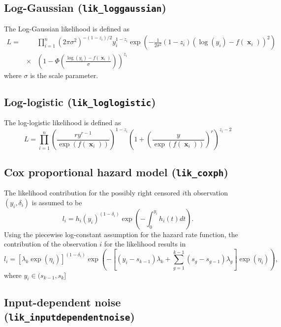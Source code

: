 \documentclass[twoside,11pt]{article}
\DeclareMathOperator{\x}{\mathbf{x}}
\newcommand{\code}[1]{{\normalfont\texttt{#1}}}
\begin{document}
\subsection*{Log-Gaussian (\code{lik\_loggaussian})}

The Log-Gaussian likelihood is defined as
\begin{eqnarray}
  L =  && \prod_{i=1}^n (2\pi \sigma^2)^{-(1-z_i)/2}y_i^{1-z_i} \exp \left(-\frac{1}{2\sigma^2}(1-z_i)(\log (y_i) - f(\x_i))^2\right) \\ \nonumber
  &\times & \left(1 - \Phi \left(\frac{\log(y_i) - f(\x_i)}{\sigma}\right)\right)^{z_i} 
\end{eqnarray}
where $\sigma$ is the scale parameter.

\subsection*{Log-logistic (\code{lik\_loglogistic})}
The log-logistic likelihood is defined as
\begin{equation}
 L = \prod_{i=1}^n \left( \frac{ry^{r-1}}{\exp(f(\x_i))} \right)^{1-z_i} \left( 1 + \left(\frac{y}{\exp(f(\x_i))}\right)^r \right)^{z_i-2}
\end{equation}

\subsection*{Cox proportional hazard model (\code{lik\_coxph})}

The likelihood contribution for the possibly right censored $i$th
observation $(y_i,\delta_i)$ is assumed to be
\begin{equation}
l_i=h_i(y_i)^{(1-\delta_i)} \exp \left(
  -\int_0^{y_i}h_i(t)dt \right).
\end{equation}
Using the piecewise log-constant assumption for the hazard rate
function, the contribution of the observation $i$ for the likelihood
results in
\begin{equation}
l_i=[\lambda_k \exp(\eta_i)]^{(1-\delta_i)}\exp \left( -[(y_i-s_{k-1})\lambda_k
  + \sum_{g=1}^{k-1}(s_g-s_{g-1})\lambda_g ]\exp(\eta_i) \right),
\end{equation}
where $y_i\in(s_{k-1},s_k]$

\subsection*{Input-dependent noise (\code{lik\_inputdependentnoise})}
\end{document}
